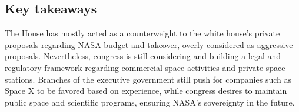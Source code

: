\subsection{Key takeaways}

The House has mostly acted as a counterweight to the white house’s private proposals regarding NASA budget and takeover, overly considered as aggressive proposals. Nevertheless, congress is still considering and building a legal and regulatory framework regarding commercial space activities and private space stations. Branches of the executive government still push for companies such as Space X to be favored based on experience, while congress desires to maintain public space and scientific programs, ensuring NASA’s sovereignty in the future.
